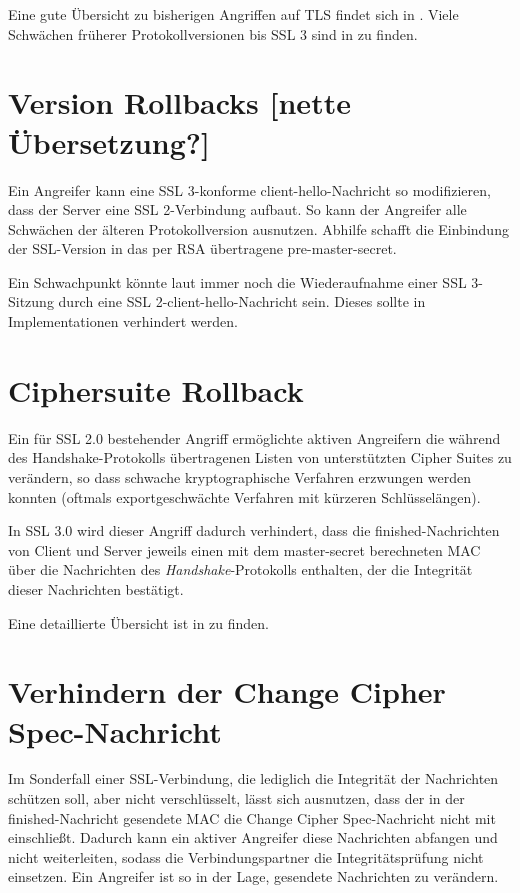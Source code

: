 \documentclass[
    12pt,
    headings=small,
    parskip=half,           %
    bibliography=totoc,
    numbers=noenddot,       %
    open=any,               %
    ]{scrreprt}
\newcommand{\mastersecret}{master-secret}
\newcommand{\premastersecret}{pre-master-secret}
\newcommand{\clienthello}{client-hello}
\newcommand{\finished}{finished}
\newcommand{\changecipherspec}{Change Cipher Spec}
\begin{document}
Eine gute Übersicht zu bisherigen Angriffen auf TLS findet sich in \cite{meyer13}. Viele Schwächen früherer Protokollversionen bis SSL 3 sind in \cite{wagner96} zu finden.

\section{Version Rollbacks [nette Übersetzung?]}

Ein Angreifer kann eine SSL 3-konforme \clienthello{}-Nachricht so modifizieren, dass der Server eine SSL 2-Verbindung aufbaut. So kann der Angreifer alle Schwächen der älteren Protokollversion ausnutzen. Abhilfe schafft die Einbindung der SSL-Version in das per RSA übertragene \premastersecret. 

Ein Schwachpunkt könnte laut \cite{wagner96} immer noch die Wiederaufnahme einer SSL 3-Sitzung durch eine SSL 2-\clienthello{}-Nachricht sein. Dieses sollte in Implementationen verhindert werden.

\section{Ciphersuite Rollback}

Ein für SSL 2.0 bestehender Angriff ermöglichte aktiven Angreifern die während des Handshake-Protokolls übertragenen Listen von unterstützten Cipher Suites zu verändern, so dass schwache kryptographische Verfahren erzwungen werden konnten (oftmals exportgeschwächte Verfahren mit kürzeren Schlüsselängen).

In SSL 3.0 wird dieser Angriff dadurch verhindert, dass die \finished{}-Nachrichten von Client und Server jeweils einen mit dem \mastersecret{} berechneten MAC über die Nachrichten des \emph{Handshake}-Protokolls enthalten, der die Integrität dieser Nachrichten bestätigt.

Eine detaillierte Übersicht ist in \cite{wagner96} zu finden.

\section{Verhindern der \changecipherspec{}-Nachricht}

Im Sonderfall einer SSL-Verbindung, die lediglich die Integrität der Nachrichten schützen soll, aber nicht verschlüsselt, lässt sich ausnutzen, dass der in der \finished{}-Nachricht gesendete MAC die \changecipherspec{}-Nachricht nicht mit einschließt. Dadurch kann ein aktiver Angreifer diese Nachrichten abfangen und nicht weiterleiten, sodass die Verbindungspartner die Integritätsprüfung nicht einsetzen. Ein Angreifer ist so in der Lage, gesendete Nachrichten zu verändern. 
\end{document}
